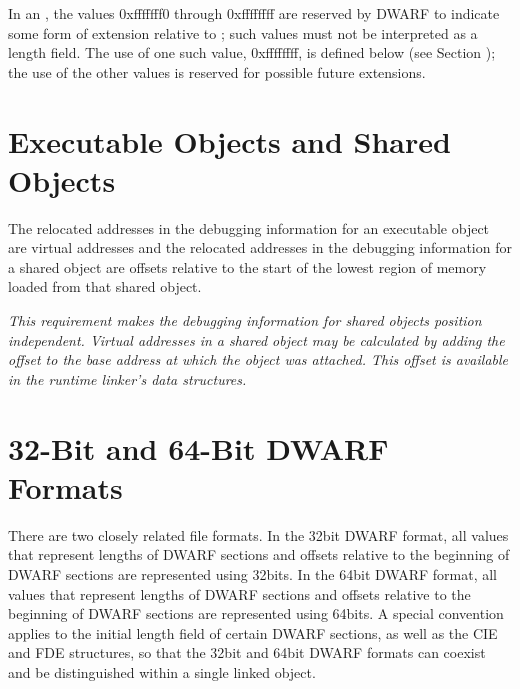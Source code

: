 In an , the values 0xfffffff0 through
0xffffffff are reserved by DWARF to indicate some form of
extension relative to ; such values must not
be interpreted as a length field. The use of one such value,
0xffffffff, is defined below 
(see Section ); 
the use of
the other values is reserved for possible future extensions.



\section{Executable Objects and Shared Objects} 
\label{datarep:executableobjectsandsharedobjects}

The relocated addresses in the debugging information for an
executable object are virtual addresses and the relocated
addresses in the debugging information for a shared object
are offsets relative to the start of the lowest region of
memory loaded from that shared object.

\textit{This requirement makes the debugging information for
shared objects position independent.  Virtual addresses in a
shared object may be calculated by adding the offset to the
base address at which the object was attached. This offset
is available in the run\dash time linker’s data structures.}



\section{32-Bit and 64-Bit DWARF Formats}
\label{datarep:32bitand64bitdwarfformats}

There are two closely related file formats. In the 32\dash bit DWARF
format, all values that represent lengths of DWARF sections
and offsets relative to the beginning of DWARF sections are
represented using 32\dash bits. In the 64\dash bit DWARF format, all
values that represent lengths of DWARF sections and offsets
relative to the beginning of DWARF sections are represented
using 64\dash bits. A special convention applies to the initial
length field of certain DWARF sections, as well as the CIE and
FDE structures, so that the 32\dash bit and 64\dash bit DWARF formats
can coexist and be distinguished within a single linked object.

